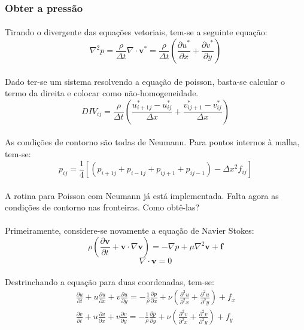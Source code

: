 \documentclass[a4paper,11pt]{article}
\begin{document}
\subsubsection{Obter a pressão}
\paragraph{} Tirando o divergente das equações vetoriais, tem-se a seguinte equação:
\begin{equation}
\nabla^2 p = \frac{\rho}{\Delta t} \nabla\cdot \textbf{v}^*=\frac{\rho}{\Delta t} 
\left( \frac{\partial u^*}{\partial x}+\frac{\partial v^*}{\partial y} \right)
\end{equation}
\paragraph{} Dado ter-se um sistema resolvendo a equação de poisson, basta-se calcular o termo da direita e colocar como não-homogeneidade.
\begin{equation}
DIV_{ij}=\frac{\rho}{\Delta t}\left( \frac{u_{i+1j}^*-u_{ij}^*}{\Delta x}+\frac{v_{ij+1}^*-v_{ij}^*}{\Delta x}\right)
\end{equation}
\paragraph{} As condições de contorno são todas de Neumann. Para pontos internos à malha, tem-se:
\begin{equation}
p_{ij}=\frac{1}{4}[(p_{i+1j}+p_{i-1j}+p_{ij+1}+p_{ij-1})-\Delta x^2 f_{ij}]
\end{equation}
\paragraph{} A rotina para Poisson com Neumann já está implementada. Falta agora
as condições de contorno nas fronteiras. Como obtê-las?
\paragraph{} Primeiramente, considere-se novamente a equação de Navier Stokes:
\[\rho\left( \frac{\partial \textbf{v}}{\partial t}+\textbf{v}\cdot\nabla\textbf{v}\right)=-\nabla p+\mu\nabla^2\textbf{v}+\textbf{f}\]
\[\nabla\cdot\textbf{v}=0\]
\paragraph{} Destrinchando a equação para duas coordenadas, tem-se:
\begin{eqnarray}
\frac{\partial u}{\partial t}+u\frac{\partial u}{\partial x}+v\frac{\partial
u}{\partial y}=-\frac{1}{\rho}\frac{\partial p}{\partial
x}+\nu\left(\frac{\partial^2 u}{\partial^2 x}+\frac{\partial^2 u}{\partial^2
y}\right)+f_x\\
\frac{\partial v}{\partial t}+u\frac{\partial v}{\partial x}+v\frac{\partial
v}{\partial y}=-\frac{1}{\rho}\frac{\partial p}{\partial
y}+\nu\left(\frac{\partial^2 v}{\partial^2 x}+\frac{\partial^2 v}{\partial^2
y}\right)+f_y
\end{eqnarray}
\end{document}
